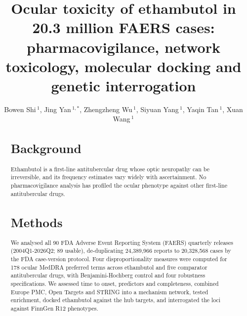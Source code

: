 \documentclass[utf8]{FrontiersinVancouver}
\def\firstAuthorLast{Shi {et~al.}}
\def\Authors{Bowen Shi\,$^{1}$, Jing Yan\,$^{1,*}$, Zhengzheng Wu\,$^{1}$, Siyuan Yang\,$^{1}$, Yaqin Tan\,$^{1}$, Xuan Wang\,$^{1}$}
\begin{document}
\onecolumn
{}

\title[Ethambutol ocular toxicity in 20.3 million FAERS cases]{Ocular toxicity of ethambutol in 20.3 million FAERS cases: pharmacovigilance, network toxicology, molecular docking and genetic interrogation}

\author[\firstAuthorLast ]{\Authors}
\address{}
\correspondance{}

\extraAuth{}

\maketitle

\begin{abstract}
\section{Background} Ethambutol is a first-line antitubercular drug whose optic neuropathy can be irreversible, and its frequency estimates vary widely with ascertainment. No pharmacovigilance analysis has profiled the ocular phenotype against other first-line antitubercular drugs.
\section{Methods} We analysed all 90 FDA Adverse Event Reporting System (FAERS) quarterly releases (2004Q1-2026Q2; 89 usable), de-duplicating 24,389,966 reports to 20,328,568 cases by the FDA case-version protocol. Four disproportionality measures were computed for 178 ocular MedDRA preferred terms across ethambutol and five comparator antitubercular drugs, with Benjamini-Hochberg control and four robustness specifications. We assessed time to onset, predictors and completeness, combined Europe PMC, Open Targets and STRING into a mechanism network, tested enrichment, docked ethambutol against the hub targets, and interrogated the loci against FinnGen R12 phenotypes.

\end{abstract}
\end{document}
